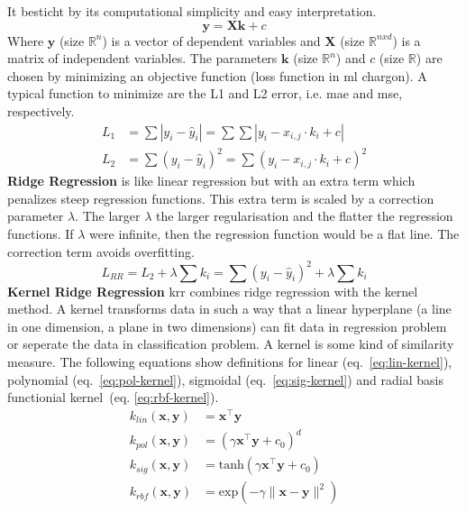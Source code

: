 It besticht by its computational simplicity and easy interpretation. 
\begin{equation}
\mathbf{y} = \mathbf{X} \mathbf{k} +c 
\end{equation}
Where $\mathbf{y}$ (size $\mathbb{R}^n$) is a vector of dependent variables and $\mathbf{X}$ (size $\mathbb{R}^{nxd}$) is a matrix of independent variables. 
The parameters $\mathbf{k}$ (size $\mathbb{R}^n$) and $c$ (size $\mathbb{R}$) are chosen by minimizing an objective function (loss function in \gls{ml} chargon).
A typical function to minimize are the L1 and L2 error, i.e. \gls{mae} and \gls{mse}, respectively.
\begin{align}
L_1&= \sum |y_i - \hat y_i| = \sum \sum |y_i - x_{i,j}\cdot k_i+c| \\
L_2&= \sum(y_i - \hat y_i)^2 = \sum (y_i - x_{i,j}\cdot k_i+c)^2
\end{align}
%
\textbf{Ridge Regression} is like linear regression but with an extra term which penalizes steep regression functions.
This extra term is scaled by a correction parameter $\lambda$. 
The larger $\lambda$ the larger regularisation and the flatter the regression functions. 
If $\lambda$ were infinite, then the regression function would be a flat line. 
The correction term avoids overfitting. 
\begin{equation}
    L_{RR} = L_2 + \lambda \sum k_i = \sum(y_i - \hat y_i)^2 + \lambda \sum k_i
\end{equation}
\textbf{Kernel Ridge Regression}
\gls{krr} combines ridge regression with the kernel method. 
A kernel transforms data in such a way that a linear hyperplane (a line in one dimension, 
a plane in two dimensions) can fit data in regression problem or seperate the data in classification problem. 
A kernel is some kind of similarity measure. 
The following equations show definitions for 
linear (eq.~\ref{eq:lin-kernel}), 
polynomial (eq.~\ref{eq:pol-kernel}), 
sigmoidal (eq.~\ref{eq:sig-kernel}) and 
radial basis functionial kernel~(eq. \ref{eq:rbf-kernel}).
\begin{align}
    \label{eq:lin-kernel}
    k_{lin}(\mathbf{x},\mathbf{y}) &= \mathbf{x}^{\top} \mathbf{y} \\
    \label{eq:pol-kernel}
    k_{pol}(\mathbf{x}, \mathbf{y}) &= (\gamma \mathbf{x}^{\top} \mathbf{y} + c_0)^d \\
    \label{eq:sig-kernel}
    k_{sig}(\mathbf{x}, \mathbf{y}) &= \text{tanh}(\gamma \mathbf{x}^{\top} \mathbf{y} + c_0) \\
    \label{eq:rbf-kernel}
    k_{rbf}(\mathbf{x}, \mathbf{y}) &= \text{exp}(- \gamma \| \mathbf{x} -  \mathbf{y} \|^2) 
\end{align}
